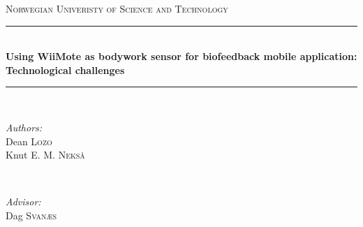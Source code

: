 \begin{titlepage}

\newcommand{\HRule}{\rule{\linewidth}{0.5mm}} %

\center %
 

\textsc{\LARGE Norwegian Univeristy of Science and Technology}\\[1.5cm] %


\HRule \\[0.4cm]
{ \huge \bfseries Using WiiMote as bodywork sensor for biofeedback mobile application: Technological challenges}\\[0.4cm] %
\HRule \\[1.5cm]
 

\begin{minipage}{0.4\textwidth}
\begin{flushleft} \large
\emph{Authors:}\\
Dean \textsc{Lozo}\\ %
Knut \textsc{E. M. Nekså}\\ %
\end{flushleft}
\end{minipage}
~
\begin{minipage}{0.4\textwidth}
\begin{flushright} \large
\emph{Advisor:} \\
Dag \textsc{Svanæs} %
\end{flushright}
\end{minipage}\\[3cm]


\end{titlepage}
